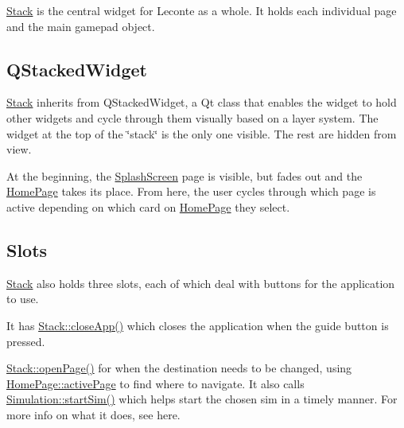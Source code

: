 \mbox{\hyperlink{classStack}{Stack}} is the central widget for Leconte as a whole. It holds each individual page and the main gamepad object.

\subsection*{Q\+Stacked\+Widget}

\mbox{\hyperlink{classStack}{Stack}} inherits from Q\+Stacked\+Widget, a Qt class that enables the widget to hold other widgets and cycle through them visually based on a layer system. The widget at the top of the \char`\"{}stack\char`\"{} is the only one visible. The rest are hidden from view.

At the beginning, the \mbox{\hyperlink{classSplashScreen}{Splash\+Screen}} page is visible, but fades out and the \mbox{\hyperlink{classHomePage}{Home\+Page}} takes its place. From here, the user cycles through which page is active depending on which card on \mbox{\hyperlink{classHomePage}{Home\+Page}} they select.

\subsection*{Slots}

\mbox{\hyperlink{classStack}{Stack}} also holds three slots, each of which deal with buttons for the application to use.

It has {\ttfamily \mbox{\hyperlink{classStack_a2f8a3dee32407abe994b7332282d03de}{Stack\+::close\+App()}}} which closes the application when the guide button is pressed.


\begin{DoxyCode}{0}
\DoxyCodeLine{    \}}
\DoxyCodeLine{\}}
\end{DoxyCode}


{\ttfamily \mbox{\hyperlink{classStack_a3663db1c1578aabe63286d4f2bb6fc6f}{Stack\+::open\+Page()}}} for when the destination needs to be changed, using {\ttfamily \mbox{\hyperlink{classHomePage_a0b6a91525a77e5ea66505666f7ba7c8d}{Home\+Page\+::active\+Page}}} to find where to navigate. It also calls {\ttfamily \mbox{\hyperlink{classSimulation_ac523544ffc2b4cffed1d2a6ead5809b1}{Simulation\+::start\+Sim()}}} which helps start the chosen sim in a timely manner. For more info on what it does, see here.


